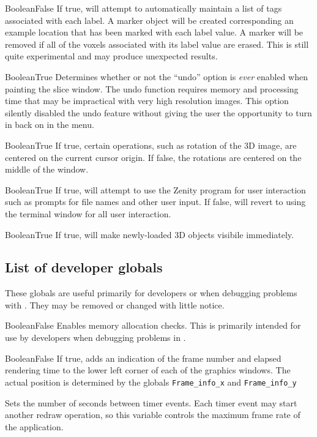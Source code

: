 {Boolean}{False}
{If true, \display{} will attempt to automatically maintain a list of
 tags associated with each label. A marker object will be created
 corresponding an example location that has been marked with each label
 value. A marker will be removed if all of the voxels associated
 with its label value are erased.
 This is still quite experimental and may produce unexpected results.}{}

{Boolean}{True}
{Determines whether or not the ``undo'' option is {\em ever} enabled when painting the slice window. The undo function requires memory and processing time that may be impractical with very high resolution images. This option silently disabled the undo feature without giving the user the opportunity to turn in back on in the menu.}{}

{Boolean}{True}
{If true, certain operations, such as rotation of the 3D image, are centered on the current cursor origin. If false, the rotations are centered on the middle of the window.}{}

{Boolean}{True}
{If true, \display{} will attempt to use the Zenity program for user interaction
such as prompts for file names and other user input. If false, 
\display{} will revert to using the terminal window for all user interaction.}{}

{Boolean}{True}
{If true, \display{} will make newly-loaded 3D objects visibile immediately.}{}

\subsection{List of developer globals}
These globals are useful primarily for developers or when debugging problems
with \display. They may be removed or changed with little notice.

{Boolean}{False}
{Enables memory allocation checks. This is primarily intended for use by developers when debugging problems in \display.}{}

{Boolean}{False}
{If true, adds an indication of the frame number and elapsed rendering time to the lower left corner of each of the graphics windows. The actual position is determined by the globals {\tt Frame\_info\_x} and {\tt Frame\_info\_y}}{}

{Sets the number of seconds between timer events. Each timer event may
start another redraw operation, so this variable controls the maximum
frame rate of the application.}{}

